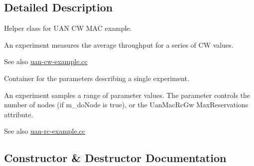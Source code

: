\subsection{Detailed Description}
Helper class for U\+AN CW M\+AC example. 

An experiment measures the average throughput for a series of CW values.

\begin{DoxySeeAlso}{See also}
\hyperlink{uan-cw-example_8cc}{uan-\/cw-\/example.\+cc}
\end{DoxySeeAlso}
Container for the parameters describing a single experiment.

An experiment samples a range of parameter values. The parameter controls the number of nodes (if m\+\_\+do\+Node is true), or the Uan\+Mac\+Rc\+Gw Max\+Reservations attribute.

\begin{DoxySeeAlso}{See also}
\hyperlink{uan-rc-example_8cc}{uan-\/rc-\/example.\+cc} 
\end{DoxySeeAlso}


\subsection{Constructor \& Destructor Documentation}
